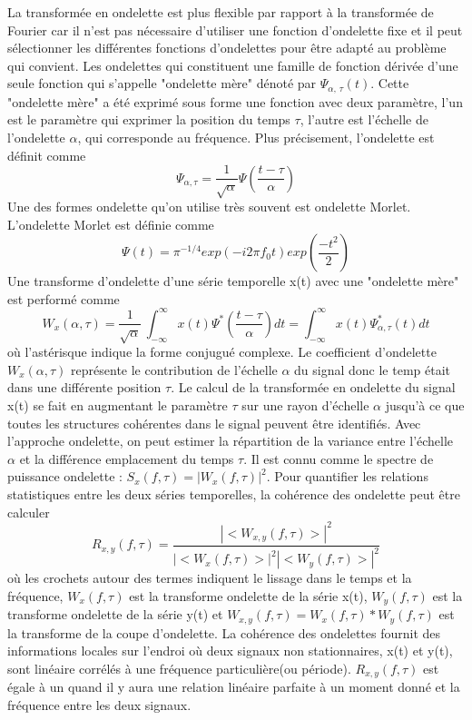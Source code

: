 La transformée en ondelette est plus flexible par rapport à la transformée de Fourier car il n'est pas nécessaire d'utiliser une fonction d'ondelette fixe et il peut sélectionner les différentes fonctions d'ondelettes pour être adapté au problème qui convient. Les ondelettes qui constituent une famille de fonction dérivée d'une seule fonction qui s'appelle "ondelette mère" dénoté par $\Psi_{\alpha, \,\tau} (t)$. Cette "ondelette mère" a été exprimé sous forme une fonction avec deux paramètre, l'un est le paramètre qui exprimer la position du temps $\tau$, l'autre est l'échelle de l'ondelette $\alpha$, qui corresponde au fréquence. Plus précisement, l'ondelette est définit comme
$$\Psi_{\alpha, \tau} = \frac{1}{\sqrt{\alpha} }\Psi \left ( \frac{t - \tau}{\alpha} \right ) $$
Une des formes ondelette qu'on utilise très souvent est ondelette Morlet. L'ondelette Morlet est définie comme
$$  \Psi (t) = \pi^{-1/4} exp (- i2\pi f_0 t) exp \left ( \frac{-t^2}{2} \right ) $$
Une transforme d'ondelette d'une série temporelle x(t) avec une "ondelette mère" est performé comme 
$$  W_x(\alpha, \tau) =  \frac{1}{\sqrt{\alpha}} \, \int_{-\infty}^{\infty} x(t) \Psi^\ast \left (  \frac {t - \tau} {\alpha}    \right ) dt = \int_{-\infty}^{\infty} x(t)\Psi^{\ast}_{\alpha,\tau} (t) dt $$
où l'astérisque indique la forme conjugué complexe. Le coefficient d'ondelette $W_x(\alpha, \tau)$ représente le contribution de l'échelle $\alpha$ du signal donc le temp était dans une différente position $\tau$. Le calcul de la transformée en ondelette du signal x(t) se fait en augmentant le paramètre $\tau$ sur une rayon d'échelle $\alpha$ jusqu'à ce que toutes les structures cohérentes dans le signal peuvent être identifiés. 
Avec l'approche ondelette, on peut estimer la répartition de la variance entre l'échelle $\alpha$ et la différence emplacement du temps $\tau$. Il est connu comme le spectre de puissance ondelette : $S_x(f,\tau) = |W_x(f,\tau)|^2$. Pour quantifier les relations statistiques entre les deux séries temporelles, la cohérence des ondelette peut être calculer
$$ R_{x,y} (f,\tau) = \frac{|<W_{x,y}(f,\tau)>|^2}{|<W_{x}(f,\tau)>|^2| <W_{y}(f,\tau)>|^2}  $$
où les crochets autour des termes indiquent le lissage dans le temps et la fréquence, $W_{x}(f,\tau)$ est la transforme ondelette de la série x(t), $W_{y}(f,\tau)$ est la transforme ondelette de la série y(t) et $W_{x,y}(f,\tau) = W_{x}(f,\tau)*W_{y}(f,\tau)$ est la transforme de la coupe d'ondelette. La cohérence des ondelettes fournit des informations locales sur l'endroi où deux signaux non stationnaires, x(t) et y(t), sont linéaire corrélés à une fréquence particulière(ou période). $R_{x,y} (f,\tau)$ est égale à un quand il y aura une relation linéaire parfaite à un moment donné et la fréquence entre les deux signaux.

